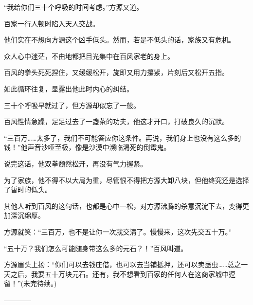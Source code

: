 \begin{this_body}
“我给你们三十个呼吸的时间考虑。”方源又道。

百家一行人顿时陷入天人交战。

他们实在不想向方源这个凶手低头。然而，若是不低头的话，家族又有危机。

众人心中迷茫，不由地都把目光集中在百风家老的身上。

百风的拳头死死捏住，又缓缓松开，旋即又用力攥紧，片刻后又松开五指。

如此循环往复，显露出他此时内心的纠结。

三十个呼吸早就过了，但方源却似忘了一般。

百风性情急躁，足足过去了一盏茶的功夫，他这才开口，打破良久的沉默。

“三百万……太多了，我们不可能答应你这条件。再说，我们身上也没有这么多的钱！”他声音沙哑至极，像是沙漠中濒临渴死的倒霉鬼。

说完这话，他双拳颓然松开，再没有气力握紧。

为了家族，他不得不以大局为重，尽管恨不得把方源大卸八块，但他终究还是选择了暂时的低头。

其他人听到百风的这句话，也都是心中一松，对方源沸腾的杀意沉淀下去，变得更加深沉绵厚。

方源就笑：“三百万，也不是让你一次就交清了。慢慢来，这次先交五十万。”

“五十万？我们怎么可能随身带这么多的元石？！”百风叫道。

方源眉头上扬：“你们可以去钱庄借，也可以去当铺抵押，还可以卖蛊虫……总之一天之后，我要五十万块元石。还有，我不想看到百家的任何人在这商家城中逗留！”(未完待续。)

------------

\end{this_body}

